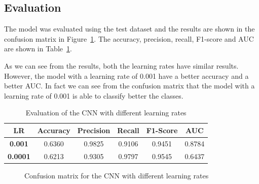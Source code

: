 \subsection{Evaluation}\label{sec:cnn-evaluation}
The model was evaluated using the test dataset and the results are shown in the confusion matrix in Figure~\ref{fig:cnn-confusion-matrix}.
The accuracy, precision, recall, F1-score and AUC are shown in Table~\ref{tab:results-cnn}.

As we can see from the results, both the learning rates have similar results.
However, the model with a learning rate of 0.001 have a better accuracy and a better AUC.
In fact we can see from the confusion matrix that the model with a learning rate of 0.001 is able to classify better the classes.


\begin{table}[h]
    \centering
    \begin{tabular}{|c|c|c|c|c|c|}
        \hline
        \textbf{LR}     & \textbf{Accuracy} & \textbf{Precision} & \textbf{Recall} & \textbf{F1-Score} & \textbf{AUC} \\
        \hline
        \textbf{0.001}  & 0.6360            & 0.9825             & 0.9106          & 0.9451            & 0.8784       \\
        \hline
        \textbf{0.0001} & 0.6213            & 0.9305             & 0.9797          & 0.9545            & 0.6437       \\
        \hline
    \end{tabular}
    \caption{Evaluation of the CNN with different learning rates}\label{tab:results-cnn}
\end{table}

\begin{figure}[h]
    \centering
    \qquad
    \caption{Confusion matrix for the CNN with different learning rates}\label{fig:cnn-confusion-matrix}
\end{figure}